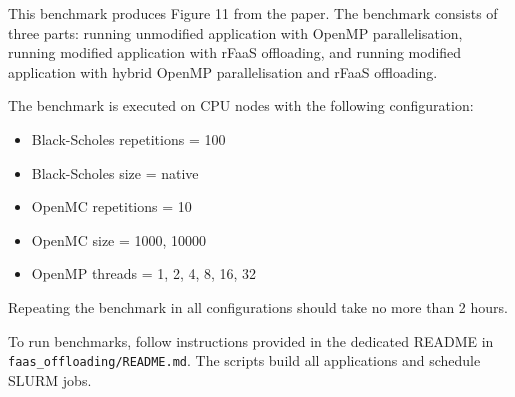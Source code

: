 \documentclass{article}
\begin{document}
This benchmark produces Figure 11 from the paper.
The benchmark consists of three parts: running unmodified application with OpenMP parallelisation,
running modified application with rFaaS offloading,
and running modified application with hybrid OpenMP parallelisation and rFaaS offloading.

The benchmark is executed on CPU nodes with the following configuration:
\begin{itemize}
\item Black-Scholes repetitions = 100
\item Black-Scholes size = native
\item OpenMC repetitions = 10
\item OpenMC size = 1000, 10000
\item OpenMP threads = 1, 2, 4, 8, 16, 32
\end{itemize}
Repeating the benchmark in all configurations should take no more than 2 hours.

To run benchmarks, follow instructions provided in the dedicated README in \texttt{faas\_offloading/README.md}.
The scripts build all applications and schedule SLURM jobs.
\end{document}
